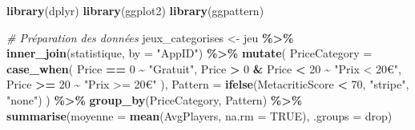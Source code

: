 \documentclass[mstat,12pt]{unswthesis}
\newenvironment{Shaded}{\begin{snugshade}}{\end{snugshade}}
\newcommand{\AttributeTok}[1]{\textcolor[rgb]{0.13,0.29,0.53}{#1}}
\newcommand{\CommentTok}[1]{\textcolor[rgb]{0.56,0.35,0.01}{\textit{#1}}}
\newcommand{\ConstantTok}[1]{\textcolor[rgb]{0.56,0.35,0.01}{#1}}
\newcommand{\DecValTok}[1]{\textcolor[rgb]{0.00,0.00,0.81}{#1}}
\newcommand{\FunctionTok}[1]{\textcolor[rgb]{0.13,0.29,0.53}{\textbf{#1}}}
\newcommand{\NormalTok}[1]{#1}
\newcommand{\OtherTok}[1]{\textcolor[rgb]{0.56,0.35,0.01}{#1}}
\newcommand{\SpecialCharTok}[1]{\textcolor[rgb]{0.81,0.36,0.00}{\textbf{#1}}}
\newcommand{\StringTok}[1]{\textcolor[rgb]{0.31,0.60,0.02}{#1}}
\begin{document}
\begin{Shaded}
\begin{Highlighting}[]
\FunctionTok{library}\NormalTok{(dplyr)}
\FunctionTok{library}\NormalTok{(ggplot2)}
\FunctionTok{library}\NormalTok{(ggpattern)}

\CommentTok{\# Préparation des données}
\NormalTok{jeux\_categorises }\OtherTok{\textless{}{-}}\NormalTok{ jeu }\SpecialCharTok{\%\textgreater{}\%}
  \FunctionTok{inner\_join}\NormalTok{(statistique, }\AttributeTok{by =} \StringTok{"AppID"}\NormalTok{) }\SpecialCharTok{\%\textgreater{}\%}
  \FunctionTok{mutate}\NormalTok{(}
    \AttributeTok{PriceCategory =} \FunctionTok{case\_when}\NormalTok{(}
\NormalTok{      Price }\SpecialCharTok{==} \DecValTok{0} \SpecialCharTok{\textasciitilde{}} \StringTok{"Gratuit"}\NormalTok{,}
\NormalTok{      Price }\SpecialCharTok{\textgreater{}} \DecValTok{0} \SpecialCharTok{\&}\NormalTok{ Price }\SpecialCharTok{\textless{}} \DecValTok{20} \SpecialCharTok{\textasciitilde{}} \StringTok{"Prix \textless{} 20€"}\NormalTok{,}
\NormalTok{      Price }\SpecialCharTok{\textgreater{}=} \DecValTok{20} \SpecialCharTok{\textasciitilde{}} \StringTok{"Prix \textgreater{}= 20€"}
\NormalTok{    ),}
    \AttributeTok{Pattern =} \FunctionTok{ifelse}\NormalTok{(MetacriticScore }\SpecialCharTok{\textless{}} \DecValTok{70}\NormalTok{, }\StringTok{"stripe"}\NormalTok{, }\StringTok{"none"}\NormalTok{)  }
\NormalTok{  ) }\SpecialCharTok{\%\textgreater{}\%}
  \FunctionTok{group\_by}\NormalTok{(PriceCategory, Pattern) }\SpecialCharTok{\%\textgreater{}\%}
  \FunctionTok{summarise}\NormalTok{(}\AttributeTok{moyenne =} \FunctionTok{mean}\NormalTok{(AvgPlayers, }\AttributeTok{na.rm =} \ConstantTok{TRUE}\NormalTok{), }\AttributeTok{.groups =} \StringTok{\textquotesingle{}drop\textquotesingle{}}\NormalTok{)}


\end{Highlighting}
\end{Shaded}
\end{document}

